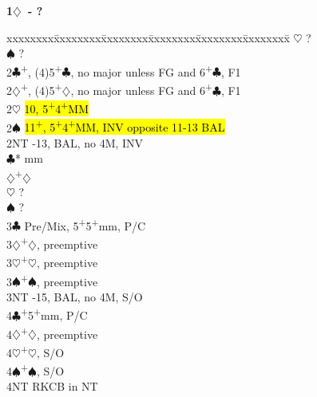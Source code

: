 \documentclass[10pt]{article}
\renewcommand{\c}{$\clubsuit$}
\renewcommand{\d}{$\diamondsuit$}
\newcommand{\h}{$\heartsuit$}
\newcommand{\s}{$\spadesuit$}
\newcommand{\p}{\textsuperscript{+}}
\newcommand{\m}{\textsuperscript{\textminus}}
\newcommand{\x}{DBL}
\newenvironment{bidtable}[1][]
{\textbf{#1}
  \begin{adjustwidth}{1em}{}
    \addvspace{2pt}
    \begin{tabbing}
      xxxxxxxx\=xxxxxxxx\=xxxxxxxx\=xxxxxxxx\=xxxxxxxx\=xxxxxxxx\=\kill}
{\end{tabbing}\end{adjustwidth}\bigskip}%
\begin{document}
\begin{multicols*}{2}
\begin{bidtable}[1\d\ - ?]
          \h        \> ?                                  \\
          \s        \> ?                                  \\
2\c       {}\p, (4)5\p\c, no major unless FG and 6\p\c, F1 \\
2\d       {}\p, (4)5\p\d, no major unless FG and 6\p\c, F1 \\
2\h       \> \hl{10\m, 5\p4\p MM}                             \\
2\s       \> \hl{11\p, 5\p4\p MM, INV opposite 11-13 BAL}     \\
2NT       -13, BAL, no 4M, INV                           \\
          \c*       {} mm                              \\
          \d        {}\p\d                              \\
          \h        \> ?                                  \\
          \s        \> ?                                  \\
3\c       \> Pre/Mix, 5\p 5\p mm, P/C                         \\
3\d       {}\p\d, preemptive                                \\
3\h       {}\p\h, preemptive                                \\
3\s       {}\p\s, preemptive                                \\
3NT       -15, BAL, no 4M, S/O                           \\
4\c       {}\p 5\p mm, P/C                                  \\
4\d       {}\p\d, preemptive                                \\
4\h       {}\p\h, S/O                                       \\
4\s       {}\p\s, S/O                                       \\
4NT       \> RKCB in NT

\end{bidtable}
\end{multicols*}
\end{document}
